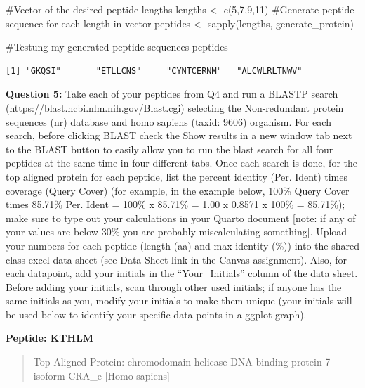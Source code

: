 \documentclass[
  letterpaper,
  DIV=11,
  numbers=noendperiod]{scrartcl}
\newenvironment{Shaded}{\begin{snugshade}}{\end{snugshade}}
\newcommand{\CommentTok}[1]{\textcolor[rgb]{0.37,0.37,0.37}{#1}}
\newcommand{\DecValTok}[1]{\textcolor[rgb]{0.68,0.00,0.00}{#1}}
\newcommand{\FunctionTok}[1]{\textcolor[rgb]{0.28,0.35,0.67}{#1}}
\newcommand{\NormalTok}[1]{\textcolor[rgb]{0.00,0.23,0.31}{#1}}
\newcommand{\OtherTok}[1]{\textcolor[rgb]{0.00,0.23,0.31}{#1}}
\begin{document}
\begin{Shaded}
\begin{Highlighting}[]
\CommentTok{\#Vector of the desired peptide lengths }
\NormalTok{lengths }\OtherTok{\textless{}{-}} \FunctionTok{c}\NormalTok{(}\DecValTok{5}\NormalTok{,}\DecValTok{7}\NormalTok{,}\DecValTok{9}\NormalTok{,}\DecValTok{11}\NormalTok{)}
\CommentTok{\#Generate peptide sequence for each length in vector}
\NormalTok{peptides }\OtherTok{\textless{}{-}} \FunctionTok{sapply}\NormalTok{(lengths, generate\_protein)}

\CommentTok{\#Testung my generated peptide sequences}
\NormalTok{peptides}
\end{Highlighting}
\end{Shaded}

\begin{verbatim}
[1] "GKQSI"       "ETLLCNS"     "CYNTCERNM"   "ALCWLRLTNWV"
\end{verbatim}

\textbf{Question 5:} Take each of your peptides from Q4 and run a BLASTP
search (https://blast.ncbi.nlm.nih.gov/Blast.cgi) selecting the
Non-redundant protein sequences (nr) database and homo sapiens (taxid:
9606) organism. For each search, before clicking BLAST check the Show
results in a new window tab next to the BLAST button to easily allow you
to run the blast search for all four peptides at the same time in four
different tabs. Once each search is done, for the top aligned protein
for each peptide, list the percent identity (Per. Ident) times coverage
(Query Cover) (for example, in the example below, 100\% Query Cover
times 85.71\% Per. Ident = 100\% x 85.71\% = 1.00 x 0.8571 x 100\% =
85.71\%); make sure to type out your calculations in your Quarto
document {[}note: if any of your values are below 30\% you are probably
miscalculating something{]}. Upload your numbers for each peptide
(length (aa) and max identity (\%)) into the shared class excel data
sheet (see Data Sheet link in the Canvas assignment). Also, for each
datapoint, add your initials in the ``Your\_Initials'' column of the
data sheet. Before adding your initials, scan through other used
initials; if anyone has the same initials as you, modify your initials
to make them unique (your initials will be used below to identify your
specific data points in a ggplot graph).

\textbf{Peptide: KTHLM}

\begin{quote}
Top Aligned Protein: chromodomain helicase DNA binding protein 7 isoform
CRA\_e {[}Homo sapiens{]}
\end{quote}
\end{document}
